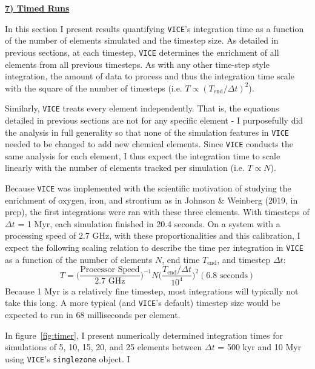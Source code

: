 \documentclass{report}
\begin{document}
\newpage 
\noindent 
\begin{center} 
\hypertarget{sec:tests}{
	\underline{\LARGE
		\textbf{7) Timed Runs}
	}
}
\end{center}
In this section I present results quantifying \texttt{VICE}'s integration 
time as a function of the number of elements simulated and the timestep size. 
As detailed in previous sections, at each timestep, \texttt{VICE} determines 
the enrichment of all elements from all previous timesteps. As with any 
other time-step style integration, the amount of data to process and thus 
the integration time scale with the square of the number of timesteps 
(i.e. $T \propto (T_\text{end}/\Delta t)^2$). 
\par
Similarly, \texttt{VICE} treats every element independently. That is, the 
equations detailed in previous sections are not for any specific element - I 
purposefully did the analysis in full generality so that none of the 
simulation features in \texttt{VICE} needed to be changed to add new chemical 
elements. Since \texttt{VICE} conducts the same analysis for each element, 
I thus expect the integration time to scale linearly with the number of 
elements tracked per simulation (i.e. $T \propto N$). 
\par
Because \texttt{VICE} was implemented with the scientific motivation of 
studying the enrichment of oxygen, iron, and strontium as in Johnson \& 
Weinberg (2019, in prep), the first integrations were ran with these three 
elements. With timesteps of $\Delta t$ = 1 Myr, each simulation finished in 
20.4 seconds. On a system with a processing speed of 2.7 GHz, with 
these proportionalities and this calibration, I expect the following scaling 
relation to describe the time per integration in \texttt{VICE} as a function 
of the number of elements $N$, end time $T_\text{end}$, and timestep 
$\Delta t$: 
\begin{equation}
T = \Big(\frac{\text{Processor Speed}}{2.7\text{ GHz}}\Big)^{-1}
N\Big(\frac{T_\text{end}/\Delta t}{10^4}\Big)^2(6.8\text{ seconds})
\end{equation}
Because 1 Myr is a relatively fine timestep, most integrations will typically 
not take this long. A more typical (and \texttt{VICE}'s default) timestep size 
would be expected to run in 68 milliseconds per element. 
\par
In figure~\ref{fig:timer}, I present numerically determined integration times 
for simulations of 5, 10, 15, 20, and 25 elements between $\Delta t$ = 
500 kyr and 10 Myr using \texttt{VICE}'s \texttt{singlezone} object. I 
\end{document}
